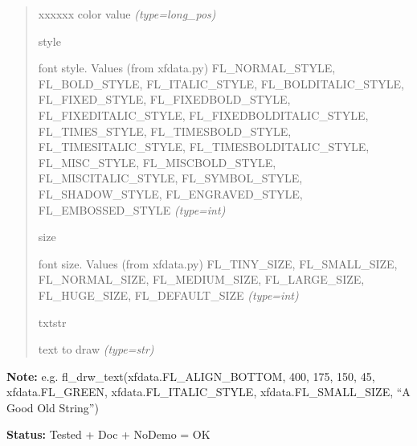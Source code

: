 \begin{boxedminipage}{\funcwidth}
\begin{quote}
\begin{Ventry}{xxxxxx}
color value
            {\it (type=long\_pos)}

          \item[style]


font style. Values (from xfdata.py) FL\_NORMAL\_STYLE, FL\_BOLD\_STYLE,
FL\_ITALIC\_STYLE, FL\_BOLDITALIC\_STYLE, FL\_FIXED\_STYLE,
FL\_FIXEDBOLD\_STYLE, FL\_FIXEDITALIC\_STYLE, FL\_FIXEDBOLDITALIC\_STYLE,
FL\_TIMES\_STYLE, FL\_TIMESBOLD\_STYLE, FL\_TIMESITALIC\_STYLE,
FL\_TIMESBOLDITALIC\_STYLE, FL\_MISC\_STYLE, FL\_MISCBOLD\_STYLE,
FL\_MISCITALIC\_STYLE, FL\_SYMBOL\_STYLE, FL\_SHADOW\_STYLE,
FL\_ENGRAVED\_STYLE, FL\_EMBOSSED\_STYLE
            {\it (type=int)}

          \item[size]


font size. Values (from xfdata.py) FL\_TINY\_SIZE, FL\_SMALL\_SIZE,
FL\_NORMAL\_SIZE, FL\_MEDIUM\_SIZE, FL\_LARGE\_SIZE, FL\_HUGE\_SIZE,
FL\_DEFAULT\_SIZE
            {\it (type=int)}

          \item[txtstr]


text to draw
            {\it (type=str)}

        \end{Ventry}

      \end{quote}

\textbf{Note:} 
e.g. fl\_drw\_text(xfdata.FL\_ALIGN\_BOTTOM, 400, 175, 150, 45,
xfdata.FL\_GREEN, xfdata.FL\_ITALIC\_STYLE, xfdata.FL\_SMALL\_SIZE,
``A Good Old String'')


\textbf{Status:} 
Tested + Doc + NoDemo = OK


    \end{boxedminipage}

    \label{xformslib:flbasic:fl_drw_text_beside}

    \vspace{0.5ex}

